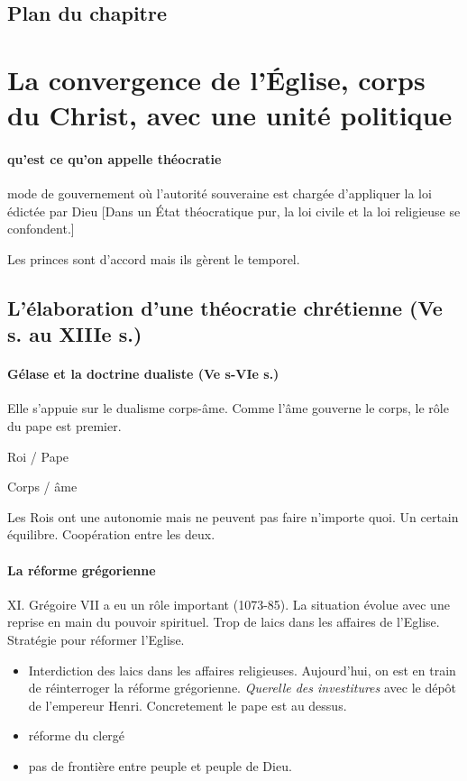 \subsection{Plan du chapitre }



\section{La convergence de l’Église, corps du Christ, avec une unité politique }


\paragraph{qu'est ce qu'on appelle théocratie} 
\begin{Def}[Théocratie]
mode de gouvernement où l'autorité souveraine est chargée d'appliquer la loi édictée par Dieu 
 [Dans un État théocratique pur, la loi civile et la loi religieuse se confondent.]
\end{Def}
Les princes sont d'accord mais ils gèrent le temporel.



\subsection{L’élaboration d’une théocratie chrétienne (Ve s. au XIIIe s.) }

\paragraph{ Gélase et la doctrine dualiste (Ve s-VIe s.)} Elle s'appuie sur le dualisme corps-âme. Comme l'âme gouverne le corps, le rôle du pape est premier.

Roi / Pape

Corps / âme

Les Rois ont une autonomie mais ne peuvent pas faire n'importe quoi. Un certain équilibre. Coopération entre les deux.



\paragraph{La réforme grégorienne} XI. Grégoire VII a eu un rôle important (1073-85). La situation évolue avec une reprise en main du pouvoir spirituel. Trop de laics dans les affaires de l'Eglise. Stratégie pour réformer l'Eglise. 
\begin{itemize}
    \item Interdiction des laics dans les affaires religieuses. Aujourd'hui, on est en train de réinterroger la réforme grégorienne. \textit{Querelle des investitures} avec le dépôt de l'empereur Henri. Concretement le pape est au dessus.  
    \item réforme du clergé
    \item pas de frontière entre peuple et peuple de Dieu. 
\end{itemize}

